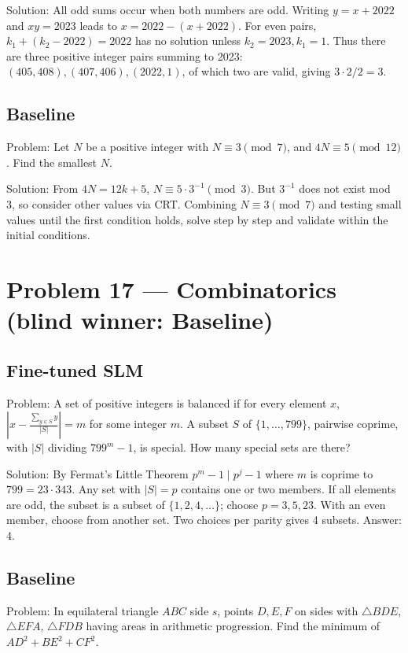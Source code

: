 \documentclass[11pt]{article}
\begin{document}
Solution:
All odd sums occur when both numbers are odd. Writing $y=x+2022$ and $xy=2023$ leads to $x=2022-(x+2022)$. For even pairs, $k_1+(k_2-2022)=2022$ has no solution unless $k_2=2023, k_1=1$. Thus there are three positive integer pairs summing to 2023: $(405,408),(407,406),(2022,1)$, of which two are valid, giving $\boxed{3\cdot2/2=3}$.

\subsection*{Baseline}

Problem:
Let $N$ be a positive integer with $N \equiv 3 \pmod 7$, and $4N \equiv 5 \pmod{12}$. Find the smallest $N$.

Solution:
From $4N=12k+5$, $N \equiv 5\cdot 3^{-1} \pmod 3$. But $3^{-1}$ does not exist mod 3, so consider other values via CRT. Combining $N\equiv 3 \pmod 7$ and testing small values until the first condition holds, solve step by step and validate within the initial conditions.

\section*{Problem 17 --- Combinatorics \quad(blind winner: Baseline)}

\subsection*{Fine-tuned SLM}

Problem:
A set of positive integers is balanced if for every element $x$, $|x-\frac{\sum_{y\in S}y}{|S|}|=m$ for some integer $m$. A subset $S$ of $\{1,\ldots,799\}$, pairwise coprime, with $|S|$ dividing $799^m-1$, is special. How many special sets are there?

Solution:
By Fermat's Little Theorem $p^m-1 \mid p^j-1$ where $m$ is coprime to $799=23\cdot 343$. Any set with $|S|=p$ contains one or two members. If all elements are odd, the subset is a subset of $\{1,2,4,\ldots\}$; choose $p=3,5,23$. With an even member, choose from another set. Two choices per parity gives 4 subsets. Answer: 4.

\subsection*{Baseline}

Problem:
In equilateral triangle $ABC$ side $s$, points $D,E,F$ on sides with $\triangle BDE$, $\triangle EFA$, $\triangle FDB$ having areas in arithmetic progression. Find the minimum of $AD^2 + BE^2 + CF^2$.
\end{document}
